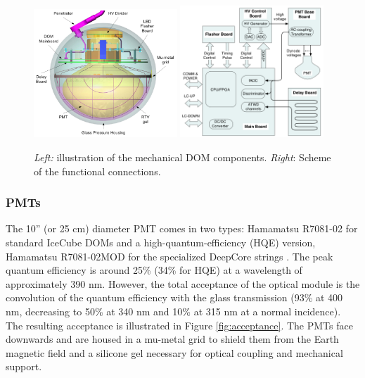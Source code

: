 \begin{figure}
\includegraphics[width=0.48\textwidth]{chapter5/img/DOM-Picture.png}
\includegraphics[width=0.48\textwidth]{chapter5/img/electronicsDOM.png}
\caption{\textit{Left:} illustration of the mechanical DOM components. \textit{Right}: Scheme of the functional connections.}
\label{fig:DOM}
\end{figure}

\subsubsection{PMTs}
The 10'' (or 25 cm) diameter PMT comes in two types: Hamamatsu R7081-02 for standard IceCube DOMs and a high-quantum-efficiency (HQE) version, Hamamatsu R7081-02MOD for the specialized DeepCore strings \cite{Abbasi:2010vc}. The peak quantum efficiency is around 25\% (34\% for HQE) at a wavelength of approximately 390 nm. However, the total acceptance of the optical module is the convolution of the quantum efficiency with the glass transmission (93\% at 400 nm, decreasing to 50\% at 340 nm and 10\% at 315 nm at a normal incidence). The resulting acceptance is illustrated in Figure \ref{fig:acceptance}. The PMTs face downwards and are housed in a mu-metal grid to shield them from the Earth magnetic field and a silicone gel necessary for optical coupling and mechanical support.

